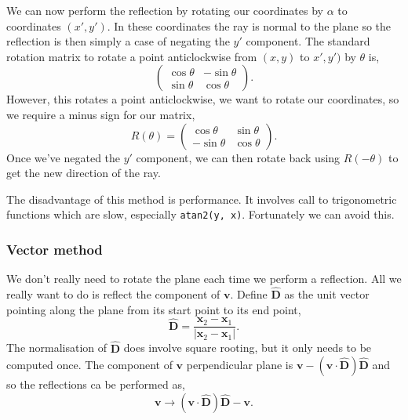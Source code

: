 \documentclass{article}
\let\vec \bm
\begin{document}
We can now perform the reflection by rotating our coordinates by $\alpha$ to coordinates $(x', y')$. In these coordinates the ray is normal to the plane so the reflection is then simply a case of negating the $y'$ component. The standard rotation matrix to rotate a point anticlockwise from $(x, y)$ to $x', y')$ by $\theta$ is,
\begin{equation}
    \begin{pmatrix}
        \cos \theta & -\sin \theta \\
        \sin \theta &  \cos \theta
    \end{pmatrix}.
\end{equation}
However, this rotates a point anticlockwise, we want to rotate our coordinates, so we require a minus sign for our matrix,
\begin{equation}
    \label{eq:rotation_matrix}
    R(\theta)
    =
    \begin{pmatrix}
         \cos \theta & \sin \theta \\
        -\sin \theta & \cos \theta
    \end{pmatrix}.
\end{equation}
Once we've negated the $y'$ component, we can then rotate back using $R(-\theta)$ to get the new direction of the ray.

The disadvantage of this method is performance. It involves call to trigonometric functions which are slow, especially \texttt{atan2(y, x)}. Fortunately we can avoid this.

\subsubsection{Vector method}
We don't really need to rotate the plane each time we perform a reflection. All we really want to do is reflect the component of $\vec{v}$. Define $\vec{\hat{D}}$ as the unit vector pointing along the plane from its start point to its end point,
\begin{equation}
    \vec{\hat{D}}
    =
    \frac{\vec{x}_2 - \vec{x}_1}{|\vec{x}_2 - \vec{x}_1|}.
\end{equation}
The normalisation of $\vec{\hat{D}}$ does involve square rooting, but it only needs to be computed once.
The component of $\vec{v}$ perpendicular plane is $\vec{v} - (\vec{v} \cdot \vec{\hat{D}}) \vec{\hat{D}}$ and so the reflections ca be performed as,
\begin{equation}
    \vec{v}
    \rightarrow
    (\vec{v} \cdot \vec{\hat{D}}) \vec{\hat{D}} - \vec{v}.
\end{equation}
\end{document}
